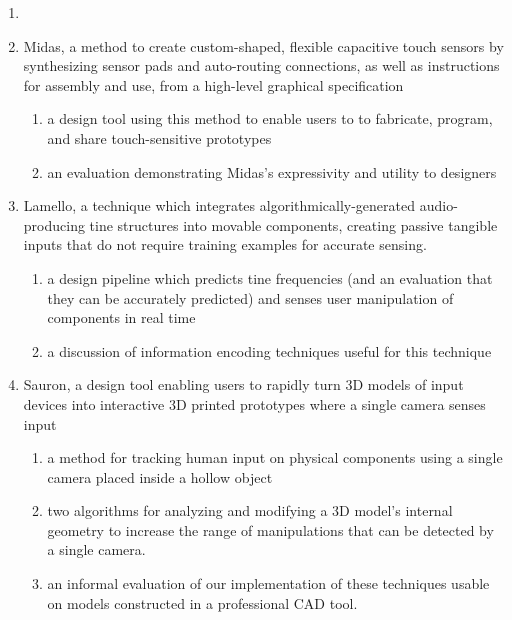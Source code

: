 \begin{enumerate}
\item {}
\item Midas, a method to create custom-shaped, flexible capacitive touch sensors by synthesizing sensor pads and auto-routing connections, as well as instructions for assembly and use, from a high-level graphical specification \begin{enumerate}
    \item a design tool using this method to enable users to to fabricate, program, and share touch-sensitive prototypes
    \item an evaluation demonstrating Midas’s expressivity and utility to designers
    \end{enumerate}
\item Lamello, a technique which integrates algorithmically-generated audio-producing tine structures into movable components, creating passive tangible inputs that do not require training examples for accurate sensing. \begin{enumerate}
    \item a design pipeline which predicts tine frequencies (and an evaluation that they can be accurately predicted) and senses user manipulation of components in real time
    \item a discussion of information encoding techniques useful for this technique 
    \end{enumerate}
\item Sauron, a design tool enabling users to
rapidly turn 3D models of input devices into interactive 3D printed prototypes where a single camera senses input \begin{enumerate}
    \item a method for tracking human input on physical components using a single camera placed inside a hollow object
    \item two algorithms for analyzing and modifying a 3D model’s internal geometry to increase the range of manipulations that can be detected by a single camera.
    \item an informal evaluation of our implementation of these techniques usable on models constructed in a professional CAD tool.
    \end{enumerate}
\end{enumerate}

